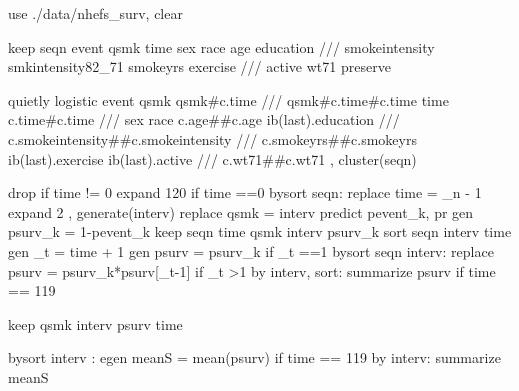 \documentclass[
  10pt,
  a4paper,
]{book}
\newenvironment{Shaded}{\begin{snugshade}}{\end{snugshade}}
\newcommand{\CommentTok}[1]{\textcolor[rgb]{0.37,0.37,0.37}{#1}}
\newcommand{\DataTypeTok}[1]{\textcolor[rgb]{0.68,0.00,0.00}{#1}}
\newcommand{\FunctionTok}[1]{\textcolor[rgb]{0.28,0.35,0.67}{#1}}
\newcommand{\KeywordTok}[1]{\textcolor[rgb]{0.00,0.46,0.62}{#1}}
\newcommand{\NormalTok}[1]{\textcolor[rgb]{0.00,0.46,0.62}{#1}}
\begin{document}
\begin{Shaded}
\begin{Highlighting}[]
\KeywordTok{use}\NormalTok{ ./}\KeywordTok{data}\NormalTok{/nhefs\_surv, }\KeywordTok{clear}

\KeywordTok{keep}\NormalTok{ seqn event qsmk time sex race age education }\CommentTok{///}
\NormalTok{  smokeintensity smkintensity82\_71  smokeyrs exercise }\CommentTok{///}
\NormalTok{  active wt71 }
\KeywordTok{preserve}
 
\KeywordTok{quietly} \KeywordTok{logistic}\NormalTok{ event qsmk qsmk\#c.time }\CommentTok{///}
\NormalTok{  qsmk\#c.time\#c.time time c.time\#c.time  }\CommentTok{///}
\NormalTok{    sex race c.age\#\#c.age ib(}\FunctionTok{last}\NormalTok{).education }\CommentTok{///}
\NormalTok{    c.smokeintensity\#\#c.smokeintensity }\CommentTok{///}
\NormalTok{    c.smokeyrs\#\#c.smokeyrs ib(}\FunctionTok{last}\NormalTok{).exercise ib(}\FunctionTok{last}\NormalTok{).active }\CommentTok{///}
\NormalTok{    c.wt71\#\#c.wt71 , }\KeywordTok{cluster}\NormalTok{(seqn) }
            
\KeywordTok{drop} \KeywordTok{if}\NormalTok{ time != 0}
\NormalTok{expand 120 }\KeywordTok{if}\NormalTok{ time ==0 }
\KeywordTok{bysort}\NormalTok{ seqn: }\KeywordTok{replace}\NormalTok{ time = }\DataTypeTok{\_n}\NormalTok{ {-} 1              }
\NormalTok{expand 2 , }\KeywordTok{generate}\NormalTok{(interv) }
\KeywordTok{replace}\NormalTok{ qsmk = interv        }
\KeywordTok{predict}\NormalTok{ pevent\_k, pr}
\KeywordTok{gen}\NormalTok{ psurv\_k = 1{-}pevent\_k}
\KeywordTok{keep}\NormalTok{ seqn  time qsmk interv psurv\_k                 }
\KeywordTok{sort}\NormalTok{ seqn interv time}
\KeywordTok{gen}\NormalTok{ \_t = time + 1}
\KeywordTok{gen}\NormalTok{ psurv = psurv\_k }\KeywordTok{if}\NormalTok{ \_t ==1       }
\KeywordTok{bysort}\NormalTok{ seqn interv: }\KeywordTok{replace}\NormalTok{ psurv = psurv\_k*psurv[\_t{-}1] }\KeywordTok{if}\NormalTok{ \_t \textgreater{}1 }
\KeywordTok{by}\NormalTok{ interv, }\KeywordTok{sort}\NormalTok{: }\KeywordTok{summarize}\NormalTok{ psurv }\KeywordTok{if}\NormalTok{ time == 119}

\KeywordTok{keep}\NormalTok{ qsmk interv psurv time   }
        
\KeywordTok{bysort}\NormalTok{ interv : }\KeywordTok{egen}\NormalTok{ meanS = }\KeywordTok{mean}\NormalTok{(psurv) }\KeywordTok{if}\NormalTok{ time == 119}
\KeywordTok{by}\NormalTok{ interv: }\KeywordTok{summarize}\NormalTok{ meanS}


\end{Highlighting}
\end{Shaded}
\end{document}
